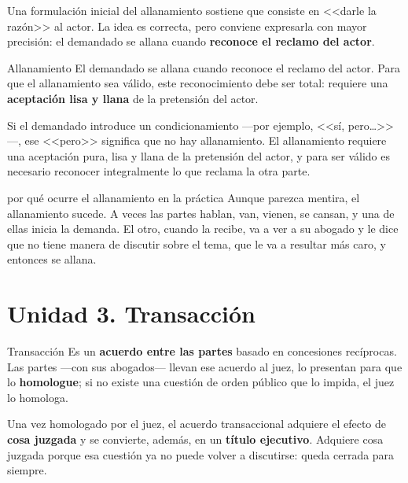 \documentclass[12pt,oneside]{book}
\begin{document}
Una formulación inicial del allanamiento sostiene que consiste en <<darle la razón>> al actor. La idea es correcta, pero conviene expresarla con mayor precisión: el demandado se allana cuando \textbf{reconoce el reclamo del actor}.

\begin{definition}{Allanamiento}
El demandado se allana cuando reconoce el reclamo del actor. Para que el allanamiento sea válido, este reconocimiento debe ser total: requiere una \textbf{aceptación lisa y llana} de la pretensión del actor.
\end{definition}

\begin{important}
Si el demandado introduce un condicionamiento ---por ejemplo, <<sí, pero\ldots>>---, ese <<pero>> significa que no hay allanamiento. El allanamiento requiere una aceptación pura, lisa y llana de la pretensión del actor, y para ser válido es necesario reconocer integralmente lo que reclama la otra parte.
\end{important}

\begin{example}{por qué ocurre el allanamiento en la práctica}
Aunque parezca mentira, el allanamiento sucede. A veces las partes hablan, van, vienen, se cansan, y una de ellas inicia la demanda. El otro, cuando la recibe, va a ver a su abogado y le dice que no tiene manera de discutir sobre el tema, que le va a resultar más caro, y entonces se allana.
\end{example}

\section{Unidad 3. Transacción}

\begin{definition}{Transacción}
Es un \textbf{acuerdo entre las partes} basado en concesiones recíprocas. Las partes ---con sus abogados--- llevan ese acuerdo al juez, lo presentan para que lo \textbf{homologue}; si no existe una cuestión de orden público que lo impida, el juez lo homologa.
\end{definition}

\begin{important}
Una vez homologado por el juez, el acuerdo transaccional adquiere el efecto de \textbf{cosa juzgada} y se convierte, además, en un \textbf{título ejecutivo}. Adquiere cosa juzgada porque esa cuestión ya no puede volver a discutirse: queda cerrada para siempre.
\end{important}
\end{document}
